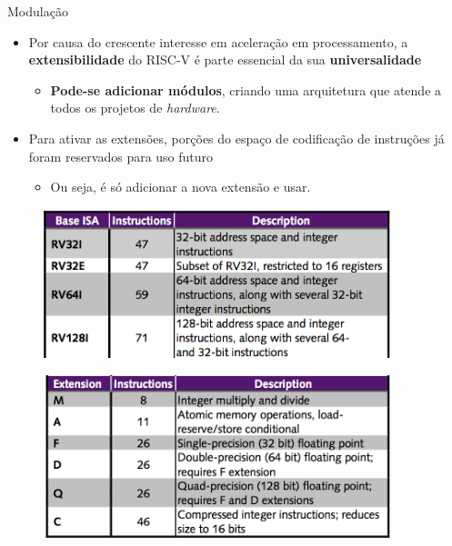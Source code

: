 \documentclass[red, aspectratio=169, xcolor=dvipsnames]{beamer}
\let\olditem=\item%
\renewcommand{\item}{\olditem \justifying}
\begin{document}
\begin{frame}{Modulação}
	\begin{itemize}
		\setlength{\itemsep}{1.5em}
		\item Por causa do crescente interesse em aceleração em processamento, a  \textbf{extensibilidade} do RISC-V é parte essencial da sua \textbf{universalidade}
		\begin{itemize}
			\setlength{\itemsep}{1em}
			\item \textbf{Pode-se adicionar módulos}, criando uma arquitetura que atende a todos os projetos de \textit{hardware}.
		\end{itemize}
		
		\item Para ativar as extensões, porções do espaço de codificação de instruções já foram reservados para uso futuro
		\begin{itemize}
			\item Ou seja, é só adicionar a nova extensão e usar.
		\end{itemize}
	\end{itemize}
\end{frame}
\begin{frame}
	\begin{figure}
		\centering
		\label{fig:bi}
		\includegraphics[width=0.9\textwidth]{img/base-instruction-a.png}
	\end{figure}
\end{frame}

\begin{frame}
	\begin{figure}
		\centering
		\label{fig:bi}
		\includegraphics[width=0.9\textwidth]{img/base-instruction-b.png}
	\end{figure}
\end{frame}
\end{document}
